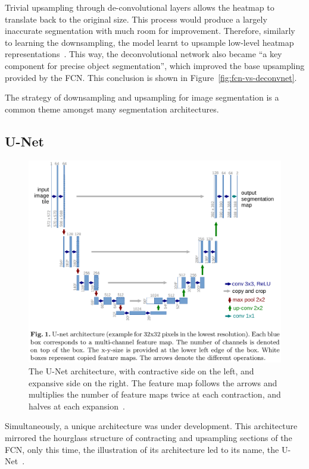 \documentclass[12pt,twoside]{report}
\begin{document}
Trivial upsampling through de-convolutional layers allows the heatmap to translate back to the original size. This process would produce a largely inaccurate segmentation with much room for improvement. Therefore, similarly to learning the downsampling, the model learnt to upsample low-level heatmap representations~\cite{noh2015learning}. This way, the deconvolutional network also became ``a key component for precise object segmentation'', which improved the base upsampling provided by the FCN. This conclusion is shown in Figure~\ref{fig:fcn-vs-deconvnet}.

The strategy of downsampling and upsampling for image segmentation is a common theme amongst many segmentation architectures.

\subsection{U-Net}

\begin{figure}[H]
  \centering
  \includegraphics[width=.8\linewidth, trim=0 200px 0 0, clip]{../figures/u-net.png}
  \caption{The U-Net architecture, with contractive side on the left, and expansive side on the right. The feature map follows the arrows and multiplies the number of feature maps twice at each contraction, and halves at each expansion~\cite{U-Net}.}\label{fig:unet}
\end{figure}


Simultaneously, a unique architecture was under development. This architecture mirrored the hourglass structure of contracting and upsampling sections of the FCN, only this time, the illustration of its architecture led to its name, the U-Net~\cite{U-Net}.
\end{document}

